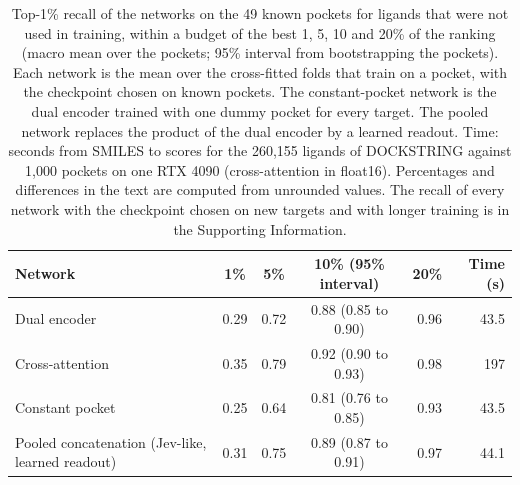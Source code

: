 \begin{table}[t]
\caption{Top-1\% recall of the networks on the 49 known pockets for ligands that were not used in training, within a budget of the best 1, 5, 10 and 20\% of the ranking (macro mean over the pockets; 95\% interval from bootstrapping the pockets). Each network is the mean over the cross-fitted folds that train on a pocket, with the checkpoint chosen on known pockets. The constant-pocket network is the dual encoder trained with one dummy pocket for every target. The pooled network replaces the product of the dual encoder by a learned readout. Time: seconds from SMILES to scores for the 260{,}155 ligands of DOCKSTRING against 1{,}000 pockets on one RTX 4090 (cross-attention in float16). Percentages and differences in the text are computed from unrounded values. The recall of every network with the checkpoint chosen on new targets and with longer training is in the Supporting Information.}
\label{tab:known}
\centering
\footnotesize
\setlength{\tabcolsep}{3pt}
\begin{tabular}{lcccrr}
\toprule
Network & 1\% & 5\% & 10\% (95\% interval) & 20\% & Time (s) \\
\midrule
Dual encoder & 0.29 & 0.72 & 0.88 (0.85 to 0.90) & 0.96 & 43.5 \\
Cross-attention & 0.35 & 0.79 & 0.92 (0.90 to 0.93) & 0.98 & 197 \\
Constant pocket & 0.25 & 0.64 & 0.81 (0.76 to 0.85) & 0.93 & 43.5 \\
Pooled concatenation (Jev-like, learned readout) & 0.31 & 0.75 & 0.89 (0.87 to 0.91) & 0.97 & 44.1 \\
\bottomrule
\end{tabular}
\end{table}
